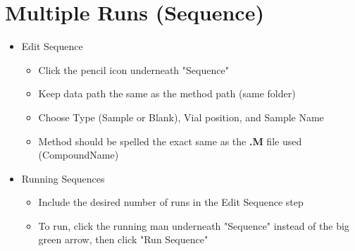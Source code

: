 \documentclass[letterpaper,11pt]{article}
\begin{document}
\section{Multiple Runs (Sequence)}
	\begin{itemize}
	\item Edit Sequence
    	\begin{itemize}
    	\item Click the pencil icon underneath "Sequence"
        \item Keep data path the same as the method path (same folder)
        \item Choose Type (Sample or Blank), Vial position, and Sample Name
        \item Method should be spelled the exact same as the \textbf{.M} file used (CompoundName)      
    	\end{itemize}
    \item Running Sequences
    	\begin{itemize}
    	\item Include the desired number of runs in the Edit Sequence step
        \item To run, click the running man underneath "Sequence" instead of the big green arrow, then click "Run Sequence"
    	\end{itemize}
	\end{itemize}
    
\end{document}
